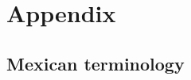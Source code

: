 \documentclass[letter,12pt]{article}
\begin{document}




\singlespacing

\section{Appendix}

\subsection{Mexican terminology}
\end{document}
